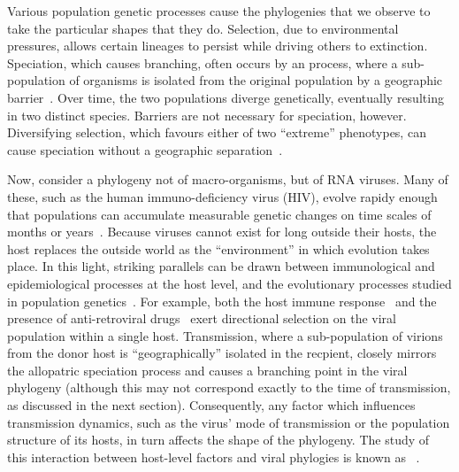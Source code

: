 Various population genetic processes cause the phylogenies that we observe to
take the particular shapes that they do. Selection, due to environmental
pressures, allows certain lineages to persist while driving others to
extinction. Speciation, which causes branching, often occurs by an
 process, where a sub-population of organisms is isolated from
the original population by a geographic barrier~\autocite{coyne2004speciation}.
Over time, the two populations diverge genetically, eventually resulting in two
distinct species. Barriers are not necessary for speciation, however.
Diversifying selection, which favours either of two ``extreme'' phenotypes, can
cause  speciation without a geographic
separation~\autocite{coyne2004speciation}.

Now, consider a phylogeny not of macro-organisms, but of RNA viruses. Many of
these, such as the human immuno-deficiency virus (HIV), evolve rapidy enough
that populations can accumulate measurable genetic changes on time scales of
months or years~\autocite{drummond2003measurably}. Because viruses cannot exist
for long outside their hosts, the host replaces the outside world as the
``environment'' in which evolution takes place. In this light, striking
parallels can be drawn between immunological and epidemiological processes at
the host level, and the evolutionary processes studied in population
genetics~\autocite{grenfell2004unifying}. For example, both the host immune
response~\autocite{mcmichael2001cellular} and the presence of anti-retroviral
drugs~\autocite{??} exert directional selection on the viral population within
a single host. Transmission, where a sub-population of virions from the donor
host is ``geographically'' isolated in the recpient, closely mirrors the
allopatric speciation process and causes a branching point in the viral
phylogeny (although this may not correspond exactly to the time of
transmission, as discussed in the next section). Consequently, any factor which
influences transmission dynamics, such as the virus' mode of transmission or
the population structure of its hosts, in turn affects the shape of the
phylogeny. The study of this interaction between host-level factors and viral
phylogies is known as ~\autocite{grenfell2004unifying}. 

